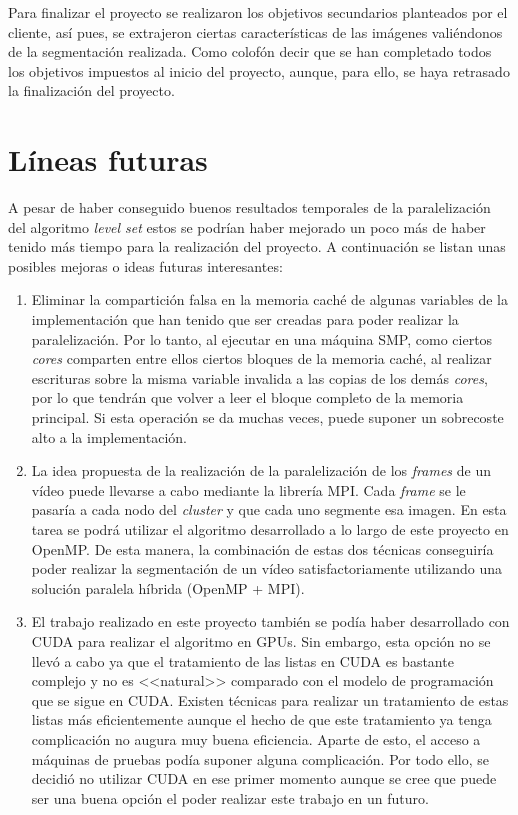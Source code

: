 Para finalizar el proyecto se realizaron los objetivos secundarios planteados por el cliente, as\'{i} pues, se extrajeron ciertas caracter\'{i}sticas de las im\'{a}genes vali\'{e}ndonos de la segmentaci\'{o}n realizada. Como colof\'{o}n decir que se han completado todos los objetivos impuestos al inicio del proyecto, aunque, para ello, se haya retrasado la finalizaci\'{o}n del proyecto.



\section{L\'{i}neas futuras}\label{propuestaDeMejora}

A pesar de haber conseguido buenos resultados temporales de la paralelizaci\'{o}n del algoritmo \textit{level set} estos se podr\'{i}an haber mejorado un poco m\'{a}s de haber tenido m\'{a}s tiempo para la realizaci\'{o}n del proyecto. A continuaci\'{o}n se listan unas posibles mejoras o ideas futuras interesantes:

\begin{enumerate}
	\item Eliminar la compartici\'{o}n falsa en la memoria cach\'{e} de algunas variables de la implementaci\'{o}n que han tenido que ser creadas para poder realizar la paralelizaci\'{o}n. Por lo tanto, al ejecutar en una m\'{a}quina SMP, como ciertos \textit{cores} comparten entre ellos ciertos bloques de la memoria cach\'{e}, al realizar escrituras sobre la misma variable invalida a las copias de los dem\'{a}s \textit{cores}, por lo que tendr\'{a}n que volver a leer el bloque completo de la memoria principal. Si esta operaci\'{o}n se da muchas veces, puede suponer un sobrecoste alto a la implementaci\'{o}n.
	\item La idea propuesta de la realizaci\'{o}n de la paralelizaci\'{o}n de los \textit{frames} de un v\'{i}deo puede llevarse a cabo mediante la librer\'{i}a MPI. Cada \textit{frame} se le pasar\'{i}a a cada nodo del \textit{cluster} y que cada uno segmente esa imagen. En esta tarea se podr\'{a} utilizar el algoritmo desarrollado a lo largo de este proyecto en OpenMP. De esta manera, la combinaci\'{o}n de estas dos t\'{e}cnicas conseguir\'{i}a poder realizar la segmentaci\'{o}n de un v\'{i}deo satisfactoriamente utilizando una soluci\'{o}n paralela h\'{i}brida (OpenMP + MPI).
	\item El trabajo realizado en este proyecto tambi\'{e}n se pod\'{i}a haber desarrollado con CUDA para realizar el algoritmo en GPUs. Sin embargo, esta opci\'{o}n no se llev\'{o} a cabo ya que el tratamiento de las listas en CUDA es bastante complejo y no es <<natural>> comparado con el modelo de programaci\'{o}n que se sigue en CUDA. Existen t\'{e}cnicas para realizar un tratamiento de estas listas m\'{a}s eficientemente aunque el hecho de que este tratamiento ya tenga complicaci\'{o}n no augura muy buena eficiencia. Aparte de esto, el acceso a m\'{a}quinas de pruebas pod\'{i}a suponer alguna complicaci\'{o}n. Por todo ello, se decidi\'{o} no utilizar CUDA en ese primer momento aunque se cree que puede ser una buena opci\'{o}n el poder realizar este trabajo en un futuro. 
\end{enumerate}
